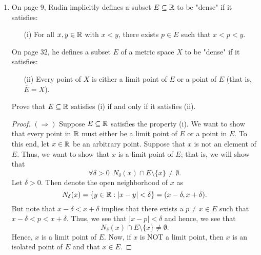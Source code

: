 \documentclass[a4paper]{article}
\begin{document}
\begin{enumerate}
\begin{proof}
    \( (\Longleftarrow) \) Suppose 
    \[  A = \bigcup_{ x \in A  }^{  } {N}_{\epsilon}(x). \tag{*} \]
    We want to show that \( A  \) is open; that is, we need to find a \( \delta > 0  \) such that \( {N}_{\delta}(x) \subseteq A  \). Let \( x \in A  \). Then by (*), we know that \( x \in \bigcup_{ x \in A  }^{  }  {N}_{\epsilon}(x) \). By definition of the arbitrary union, we see that we can find \(  \delta  > 0 \) such that \( {N}_{\delta}(x) \subseteq \bigcup_{ x \in A  }^{   }  {N}_{\epsilon}(x) = A  \). Thus, \( A  \) must be an open set. 
    \end{proof}
\item On page 9, Rudin implicitly defines a subset \( E \subseteq \mathbb{R}   \) to be "dense" if it satisfies:
    \begin{enumerate}
        \item[(i)] For all \( x,y \in \mathbb{R}  \) with \( x < y  \), there exists \( p \in E  \) such that \( x < p < y  \).
    \end{enumerate}
    On page 32, he defines a subset \( E  \) of a metric space \( X  \) to be "dense" if it satisfies:
    \begin{enumerate}
        \item[(ii)] Every point of \( X  \) is either a limit point of \( E  \) or a point of \( E  \) (that is, \( \overline{E} = X  \)).
    \end{enumerate}
    Prove that \( E \subseteq \mathbb{R}  \) satisfies (i) if and only if it satisfies (ii).
    \begin{proof}
    \( (\Longrightarrow) \) Suppose \( E \subseteq \mathbb{R}  \) satisfies the property (i). We want to show that every point in \( \mathbb{R}  \) must either be a limit point of \( E  \) or a point in \( E  \). To this end, let \( x \in \mathbb{R}  \) be an arbitrary point. Suppose that \( x  \) is not an element of \( E  \). Thus, we want to show that \( x  \) is a limit point of \( E  \); that is, we will show that 
    \[  \forall \delta > 0 \ \ {N}_{\delta}(x) \cap E \setminus  \{ x  \}  \neq \emptyset. \]
    Let \( \delta > 0 \). Then denote the open neighborhood of \( x  \) as 
    \[  {N}_{\delta}(x) = \{ y \in \mathbb{R} : | x - y | < \delta \} = (x - \delta, x  + \delta).  \]
    But note that \( x - \delta < x + \delta  \) implies that there exists a \( p \neq x  \in E  \) such that \( x - \delta < p < x + \delta \). Thus, we see that \( |  x - p  |  < \delta  \) and hence, we see that 
    \[  {N}_{\delta}(x) \cap E \setminus  \{ x \} \neq \emptyset.  \]
    Hence, \( x  \) is a limit point of \( E  \). Now, if \( x  \) is NOT a limit point, then \( x  \) is an isolated point of \( E  \) and that \(  x \in E  \).
    

\end{proof}
\end{enumerate}
\end{document}
